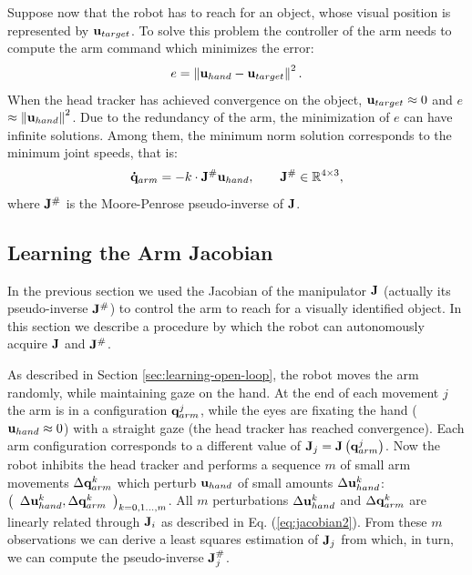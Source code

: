 Suppose now that the robot has to reach for an object, whose visual position is 
represented by $\mathbf{u}_{target}$. To solve this problem 
the controller of the arm needs to compute the arm command which minimizes 
the error:
%
\begin{equation}
  e=\left\|\mathbf{u}_{hand}-\mathbf{u}_{target}\right\|^2.
\end{equation}
%
When the head tracker has achieved convergence on the object, 
$\mathbf{u}_{target} \approx 0 $ and $e$ $\approx \left\|\mathbf{u}_{hand}\right\|^2$.
Due to the redundancy of the arm, the minimization of $e$ can have
infinite solutions. Among them, the minimum norm solution corresponds
to the minimum joint speeds, that is:
%
\begin{equation}
\mathbf{\dot q}_{arm}=-k \cdot \mathbf J^\# \mathbf{u}_{hand}, 
\qquad \mathbf J^\# \in \mathbb R^{4 \times 3},
\end{equation}
%
where $\mathbf J^\#$ is the Moore-Penrose pseudo-inverse of $\mathbf J$.

\subsection{Learning the Arm Jacobian}
%
In the previous section we used the Jacobian of the manipulator
$\mathbf J$ (actually its pseudo-inverse $\mathbf J^\#$) to 
control the arm to reach for a visually identified object. In 
this section we describe a procedure by which the robot can 
autonomously acquire $\mathbf J$ and $\mathbf J^\#$.

As described in Section \ref{sec:learning-open-loop}, the robot 
moves the arm randomly, while maintaining gaze on the hand. At 
the end of each movement $j$ the arm is in a configuration 
$\mathbf q_{arm}^j$,  while the eyes are fixating the hand 
($\mathbf{u}_{hand} \approx 0$) with a straight gaze
(the head tracker has reached convergence). Each 
arm configuration corresponds to a different value of 
$\mathbf J_j=\mathbf J\left(\mathbf q_{arm}^j\right)$. 
Now the robot inhibits the head tracker and performs a sequence $m$
of small arm movements $\Delta \mathbf {q}_{arm}^k$ which perturb $\mathbf{u}_{hand}$ of small amounts $\Delta \mathbf {u}_{hand}^k$:$
  \left(\begin{array}{cc}
    \Delta \mathbf {u}_{hand}^k , 
	\Delta \mathbf {q}_{arm}^k \end{array}
  \right)_{k = 0,1\dots,m}
$. All $m$ perturbations $\Delta \mathbf {u}_{hand}^k$ and 
$\Delta \mathbf {q}_{arm}^k$ are linearly related through $\mathbf J_i$ 
as described in Eq. (\ref{eq:jacobian2}). From these $m$ 
observations we can derive a least squares estimation of $\mathbf J_j$ from 
which, in turn, we can compute the pseudo-inverse $\mathbf J_j^\#$. 

